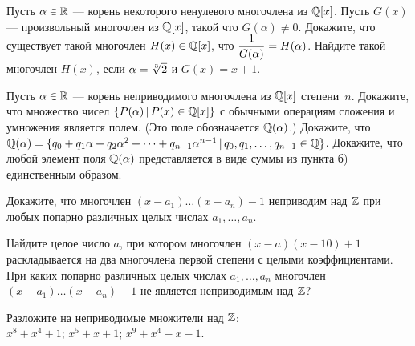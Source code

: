 \documentclass[a4paper,12pt]{article}
\begin{document}
Пусть  $\alpha\in\mathbb{R}$ --- корень некоторого ненулевого
многочлена из $\mathbb{Q}[x]$.
Пусть $G(x)$ --- произвольный многочлен из $\mathbb{Q}[x]$, такой что
$G(\alpha)\ne0.$
Докажите, что  существует такой многочлен $H(x)\in\mathbb{Q}[x]$, что
$\displaystyle{1\over{G(\alpha)}}=H(\alpha)$.
Найдите такой многочлен $H(x)$, если $\alpha=\root 3\of 2$ и $G(x)=x+1$.

Пусть  $\alpha\in\mathbb{R}$ --- корень  неприводимого
многочлена из $\mathbb{Q}[x]$ степени~$n$.
 Докажите, что множество чисел $\{P(\alpha)\,|\,P(x)\in\mathbb{Q}[x]\}$ с
обычными операциям сложения и умножения является полем.
(Это поле обозначается $\mathbb{Q}(\alpha)$.)
 Докажите, что
$\mathbb{Q}(\alpha)=
\{q_0+q_1\alpha+q_2\alpha^2+\dots+q_{n-1}\alpha^{n-1}\,|\,q_0,q_1,\dots,q_{n-1}\in\mathbb{Q}\}$.
 Докажите, что любой элемент поля $\mathbb{Q}(\alpha)$
представляется в виде суммы из пункта б) единственным образом.

 Докажите, что  многочлен  $(x-a_1)\dots(x-a_n)-1$  неприводим над  $\mathbb{Z}$
 при любых попарно различных целых числах  $a_1,\dots,a_n.$


  Найдите целое число $a$, при котором многочлен
$(x-a)(x-10)+1$ раскладывается на два многочлена первой степени
с целыми коэффициентами.
 При каких попарно различных целых числах  $a_1,\dots,a_n$ многочлен
$(x-a_1)\dots(x-a_n)+1$  не является неприводимым над  $\mathbb{Z}$?


  Разложите на неприводимые множители над  $\mathbb{Z}$:\\
 $x^8+x^4+1$;
 $x^5+x+1$;
 $x^9+x^4-x-1$.


\end{document}
